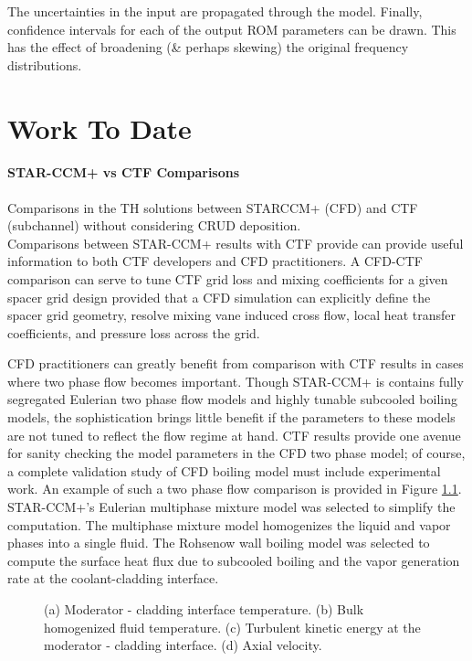 \documentclass[10pt,a4paper]{report}
\begin{document}
The uncertainties in the input are propagated through the model.  Finally, confidence intervals for each of the output ROM parameters can be drawn.  This has the effect of broadening (\& perhaps skewing) the original frequency distributions.

\chapter{Work To Date}


\subsubsection{STAR-CCM+ vs CTF Comparisons}

Comparisons in the TH solutions between STARCCM+ (CFD) and CTF (subchannel) without considering CRUD deposition. \\

Comparisons between STAR-CCM+ results with CTF provide can provide useful information to both CTF developers and CFD practitioners.   A CFD-CTF comparison can serve to tune CTF grid loss and mixing coefficients for a given spacer grid design provided that a CFD simulation can explicitly define the spacer grid geometry, resolve mixing vane induced cross flow, local heat transfer coefficients, and pressure loss across the grid.

CFD practitioners can greatly benefit from comparison with CTF results in cases where two phase flow becomes important.  Though STAR-CCM+ is contains fully segregated Eulerian two phase flow models and highly tunable subcooled boiling models, the sophistication brings little benefit if the parameters to these models are not tuned to reflect the flow regime at hand.  CTF results provide one avenue for sanity checking the model parameters in the CFD two phase model; of course, a complete validation study of CFD boiling model must include experimental work.  An example of such a two phase flow comparison is provided in Figure \ref{compare}.  STAR-CCM+'s Eulerian multiphase mixture model was selected to simplify the computation.  The multiphase mixture model homogenizes the liquid and vapor phases into a single fluid.  The Rohsenow wall boiling model was selected to compute the surface heat flux due to subcooled boiling and the vapor generation rate at the coolant-cladding interface.  

\begin{figure}
\centering
{}
\hspace{0mm}
\caption{(a) Moderator - cladding interface temperature. (b) Bulk homogenized fluid temperature. (c)  Turbulent kinetic energy at the moderator - cladding interface. (d) Axial velocity. }
\label{compare}
\end{figure}
\end{document}

